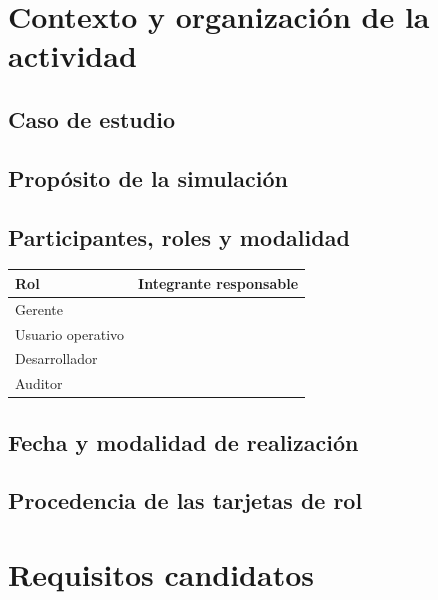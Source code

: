 \documentclass[11pt,a4paper]{article}
\begin{document}
\section{Contexto y organización de la actividad}

\subsection{Caso de estudio}

\subsection{Propósito de la simulación}

\subsection{Participantes, roles y modalidad}

\begin{tabularx}{\textwidth}{
    |L{3cm}
    |>{\raggedright\arraybackslash}X|
}
\hline
{}
\textbf{Rol} & \textbf{Integrante responsable} \\
\hline
Gerente & \\
\hline
Usuario operativo & \\
\hline
Desarrollador & \\
\hline
Auditor & \\
\hline
\end{tabularx}

\subsection{Fecha y modalidad de realización}

\subsection{Procedencia de las tarjetas de rol}

\section{Requisitos candidatos}
\end{document}
